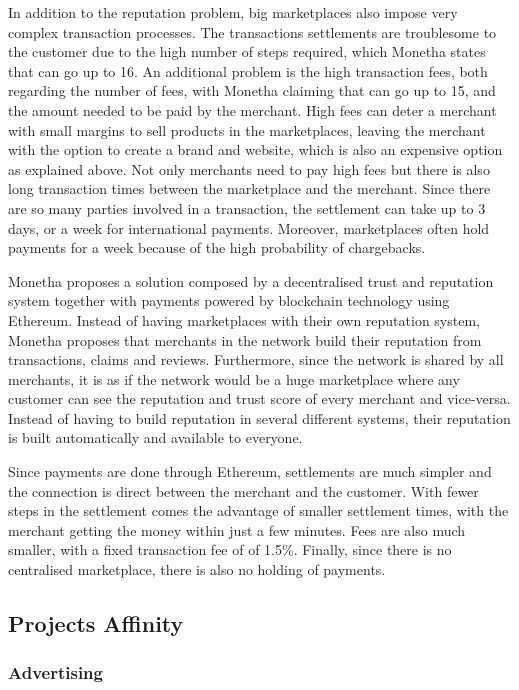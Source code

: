 \medskip

In addition to the reputation problem, big marketplaces also impose very complex transaction processes. The transactions settlements are troublesome to the customer due to the high number of steps required, which Monetha states that can go up to 16. An additional problem is the high transaction fees, both regarding the number of fees, with Monetha claiming that can go up to 15, and the amount needed to be paid by the merchant. High fees can deter a merchant with small margins to sell products in the marketplaces, leaving the merchant with the option to create a brand and website, which is also an expensive option as explained above. Not only merchants need to pay high fees but there is also long transaction times between the marketplace and the merchant. Since there are so many parties involved in a transaction, the settlement can take up to 3 days, or a week for international payments. Moreover, marketplaces often hold payments for a week because of the high probability of chargebacks.

\medskip

Monetha proposes a solution composed by a decentralised trust and reputation system together with payments powered by blockchain technology using Ethereum. Instead of having marketplaces with their own reputation system, Monetha proposes that merchants in the network build their reputation from transactions, claims and reviews. Furthermore, since the network is shared by all merchants, it is as if the network would be a huge marketplace where any customer can see the reputation and trust score of every merchant and vice-versa. Instead of having to build reputation in several different systems, their reputation is built automatically and available to everyone.

Since payments are done through Ethereum, settlements are much simpler and the connection is direct between the merchant and the customer. With fewer steps in the settlement comes the advantage of smaller settlement times, with the merchant getting the money within just a few minutes. Fees are also much smaller, with a fixed transaction fee of of 1.5\%. Finally, since there is no centralised marketplace, there is also no holding of payments.

\subsection{Projects Affinity}

\subsubsection{Advertising}

